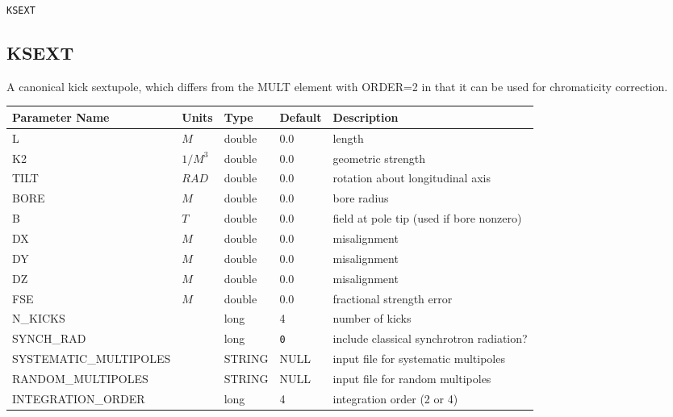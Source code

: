 \begin{latexonly}
\newpage
\begin{center}{\Large\verb|KSEXT|}\end{center}
\end{latexonly}\subsection{KSEXT}
A canonical kick sextupole, which differs from the MULT element with ORDER=2 in
that it can be used for chromaticity correction.
\\
\begin{tabular}{|l|l|l|l|p{\descwidth}|} \hline
Parameter Name & Units & Type & Default & Description \\ \hline 
L & $M$ & double &  0.0 & length  \\ \hline 
K2 & $1/M^{3}$ & double &  0.0 & geometric strength  \\ \hline 
TILT & $RAD$ & double &  0.0 & rotation about longitudinal axis  \\ \hline 
BORE & $M$ & double &  0.0 & bore radius  \\ \hline 
B & $T$ & double &  0.0 & field at pole tip (used if bore nonzero)  \\ \hline 
DX & $M$ & double &  0.0 & misalignment  \\ \hline 
DY & $M$ & double &  0.0 & misalignment  \\ \hline 
DZ & $M$ & double &  0.0 & misalignment  \\ \hline 
FSE & $M$ & double &  0.0 & fractional strength error  \\ \hline 
N\_KICKS &  & long &   4               & number of kicks  \\ \hline 
SYNCH\_RAD &  & long &  \verb|0| & include classical synchrotron radiation?  \\ \hline 
SYSTEMATIC\_MULTIPOLES &  & STRING &   NULL            & input file for systematic multipoles  \\ \hline 
RANDOM\_MULTIPOLES &  & STRING &   NULL            & input file for random multipoles  \\ \hline 
INTEGRATION\_ORDER &  & long &   4               & integration order (2 or 4)  \\ \hline 
\end{tabular}

